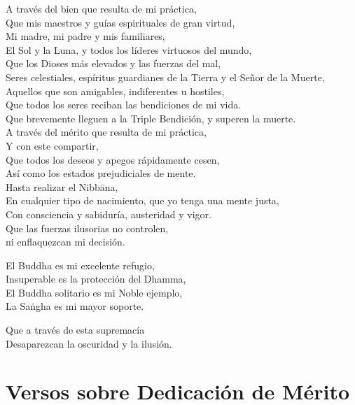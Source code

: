 A través del bien que resulta de mi práctica,\\
Que mis maestros y guías espirituales de gran virtud,\\
Mi madre, mi padre y mis familiares,\\
El Sol y la Luna, y todos los líderes virtuosos del mundo,\\
Que los Dioses más elevados y las fuerzas del mal,\\
Seres celestiales, espíritus guardianes de la Tierra y el Señor de la Muerte,\\
Aquellos que son amigables, indiferentes u hostiles,\\
Que todos los seres reciban las bendiciones de mi vida.\\
Que brevemente lleguen a la Triple Bendición, y superen la muerte.\\
A través del mérito que resulta de mi práctica,\\
Y con este compartir,\\
Que todos los deseos y apegos rápidamente cesen,\\
Así como los estados prejudiciales de mente.\\
Hasta realizar el Nibbāna,\\
En cualquier tipo de nacimiento, que yo tenga una mente justa,\\
Con consciencia y sabiduría, austeridad y vigor.\\
Que las fuerzas ilusorias no controlen,\\
ni enflaquezcan mi decisión.

El Buddha es mi excelente refugio,\\
Insuperable es la protección del Dhamma,\\
El Buddha solitario es mi Noble ejemplo,\\
La Saṅgha es mi mayor soporte.

Que a través de esta supremacía\\
Desaparezcan la oscuridad y la ilusión.

\chapter[Dedicación de Mérito]{Versos sobre Dedicación de Mérito}


\begin{leader}
\end{leader}

